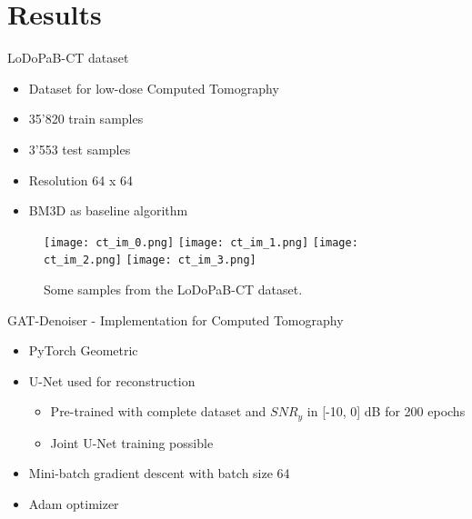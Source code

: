 
\section{Results}

\begin{frame}{LoDoPaB-CT dataset}
  \begin{itemize}
      \item Dataset for low-dose Computed Tomography
      \item 35'820 train samples
      \item 3'553 test samples
      \item Resolution 64 x 64
      \item BM3D as baseline algorithm
  \end{itemize}
  \begin{figure}
    \centering
    \hfill
    \texttt{[image: ct\_im\_0.png]}
    \hfill
    \texttt{[image: ct\_im\_1.png]}
    \hfill
    \texttt{[image: ct\_im\_2.png]}
    \hfill
    \texttt{[image: ct\_im\_3.png]}
    \hfill
    \caption{Some samples from the LoDoPaB-CT dataset.}
  \end{figure}
\end{frame}


\begin{frame}{GAT-Denoiser - Implementation for Computed Tomography}
  \begin{itemize}
    \item PyTorch Geometric
    \item U-Net used for reconstruction
    \begin{itemize}
        \item Pre-trained with complete dataset and $SNR_y$ in [-10, 0] dB for 200 epochs
        \item Joint U-Net training possible
    \end{itemize}
    \item Mini-batch gradient descent with batch size 64
    \item Adam optimizer
    
  \end{itemize}
\end{frame}




